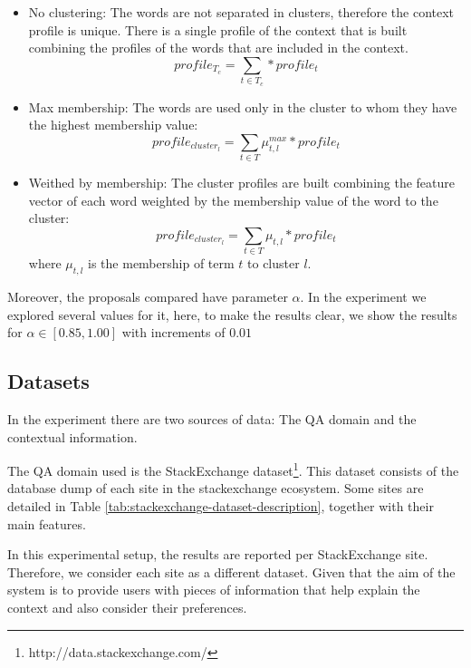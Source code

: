 \documentclass[preprint]{elsarticle}
\begin{document}
\begin{spacing}{1.5}
\begin{itemize}

	\item No clustering: The words are not separated in clusters, therefore the context profile is unique. There is a single profile of the context that is built combining the profiles of the words that are included in the context.
	\begin{equation}
		profile_{T_c} = \sum_{t \in T_c} * profile_t
	\end{equation}

	\item Max membership: The words are used only in the cluster to whom they have the highest membership value:
	\begin{equation}
		profile_{cluster_l} = \sum_{t \in T} \mu^{max}_{t,l} * profile_t
	\end{equation}

	\item Weithed by membership: The cluster profiles are built combining the feature vector of each word weighted by the membership value of the word to the cluster:
	\begin{equation}
		profile_{cluster_l} = \sum_{t \in T} \mu_{t,l} * profile_t
	\end{equation}
	\noindent where $\mu_{t,l}$ is the membership of term $t$ to cluster $l$.

\end{itemize}

Moreover, the proposals compared have parameter $\alpha$. In the experiment we explored several values for it, here, to make the results clear, we show the results for $\alpha \in [0.85,1.00]$ with increments of $0.01$

\subsection{Datasets}

In the experiment there are two sources of data: The QA domain and the contextual information.

The QA domain used is the StackExchange dataset\footnote{http://data.stackexchange.com/}. This dataset consists of the database dump of each site in the stackexchange ecosystem. Some sites are detailed in Table \ref{tab:stackexchange-dataset-description}, together with their main features.

In this experimental setup, the results are reported per StackExchange site. Therefore, we consider each site as a different dataset. Given that the aim of the system is to provide users with pieces of information that help explain the context and also consider their preferences.


\end{spacing}
\end{document}
